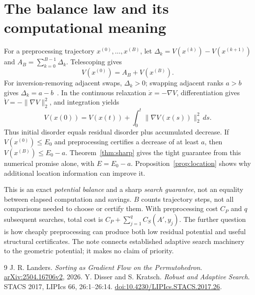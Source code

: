\documentclass[10pt,letterpaper]{article}
\begin{document}
\section{The balance law and its computational meaning}
For a preprocessing trajectory $x^{(0)},\ldots,x^{(B)}$, let
$\Delta_k=V(x^{(k)})-V(x^{(k+1)})$ and $A_B=\sum_{k=0}^{B-1}\Delta_k$. Telescoping gives
\begin{equation}
 \boxed{V(x^{(0)})=A_B+V(x^{(B)}).} \label{eq:balance}
\end{equation}
For inversion-removing adjacent swaps, $\Delta_k>0$; swapping adjacent ranks $a>b$
gives $\Delta_k=a-b$~\cite{landers}. In the continuous relaxation
$\dot x=-\nabla V$, differentiation gives $\dot V=-\|\nabla V\|_2^2$, and integration yields
\begin{equation}
 V(x(0))=V(x(t))+\int_0^t\|\nabla V(x(s))\|_2^2\,ds.
 \label{eq:flow}
\end{equation}
Thus initial disorder equals residual disorder plus accumulated decrease. If
$V(x^{(0)})\leq E_0$ and preprocessing certifies a decrease of at least $a$, then
$V(x^{(B)})\leq E_0-a$. Theorem~\ref{thm:sharp} gives the tight guarantee from
this numerical promise alone, with $E=E_0-a$. Proposition~\ref{prop:location} shows
why additional location information can improve it.

This is an exact \emph{potential balance} and a sharp \emph{search guarantee}, not an
equality between elapsed computation and savings. $B$ counts trajectory steps, not
all comparisons needed to choose or certify them. With preprocessing cost $C_P$ and
$q$ subsequent searches, total cost is $C_P+\sum_{j=1}^q C_S(A',y_j)$.
The further question is how cheaply preprocessing can produce both low residual
potential and useful structural certificates. The note connects established adaptive
search machinery~\cite{disser} to the geometric potential; it makes no claim of priority.

\vspace{-2pt}
\begin{thebibliography}{9}
\setlength{\itemsep}{0pt}
\small
{} J. R. Landers. \emph{Sorting as Gradient Flow on the Permutohedron}.
\href{https://arxiv.org/abs/2504.16706v2}{arXiv:2504.16706v2}, 2026.
 Y. Disser and S. Kratsch. \emph{Robust and Adaptive Search}.
STACS 2017, LIPIcs 66, 26:1--26:14.
\href{https://doi.org/10.4230/LIPIcs.STACS.2017.26}{doi:10.4230/LIPIcs.STACS.2017.26}.
\end{thebibliography}
\end{document}
